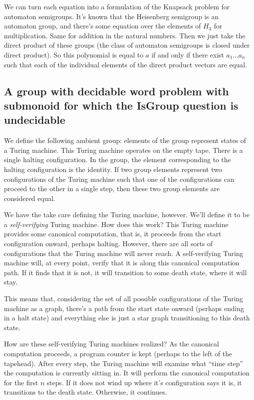 \documentclass[10pt]{article}
\newcommand{\defn}[1]{\textit{#1}}
\begin{document}
We can turn each equation into a formulation of the Knapsack problem
for automaton semigroups. It's known that the Heisenberg semigroup is
an automaton group, and there's some equation over the elements of
$H_3$ for multiplication. Same for addition in the natural
numbers. Then we just take the direct product of these groups (the
class of automaton semigroups is closed under direct product). So this
polynomial is equal to $a$ if and only if there exist $a_1 \ldots a_n$
such that each of the individual elements of the direct product
vectors are equal.

\subsection{A group with decidable word problem with submonoid for
  which the IsGroup question is undecidable}

We define the following ambient group: elements of the group represent
states of a Turing machine. This Turing machine operates on the empty
tape. There is a single halting configuration. In the group, the
element corresponding to the halting configuration is the identity. If
two group elements represent two configurations of the Turing machine
such that one of the configurations can proceed to the other in a
single step, then these two group elements are considered equal.

We have the take care defining the Turing machine, however. We'll
define it to be a \defn{self-verifying} Turing machine. How does this
work? This Turing machine provides some canonical computation, that
is, it proceeds from the start configuration onward, perhaps
halting. However, there are all sorts of configurations that the
Turing machine will never reach. A self-verifying Turing machine will,
at every point, verify that it is along this canonical computation
path. If it finds that it is not, it will transition to some death
state, where it will stay.

This means that, considering the set of all possible configurations of
the Turing machine as a graph, there's a path from the start state
onward (perhaps ending in a halt state) and everything else is just a
star graph transitioning to this death state.

How are these self-verifying Turing machines realized? As the
canonical computation proceeds, a program counter is kept (perhaps to
the left of the tapehead). After every step, the Turing machine will
examine what ``time step'' the computation is currently sitting in. It
will perform the canonical computation for the first $n$ steps. If it
does not wind up where it's configuration says it is, it transitions
to the death state. Otherwise, it continues.
\end{document}
